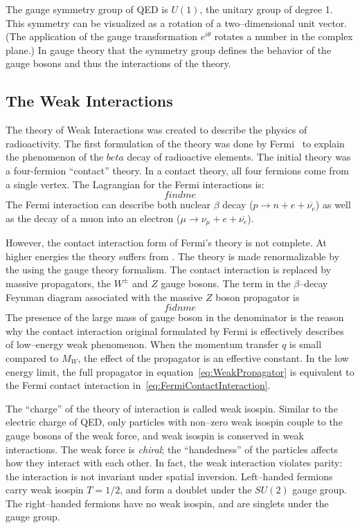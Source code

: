 The gauge symmetry group of QED is $U(1)$, the unitary group of degree 1.  This
symmetry can be visualized as a rotation of a two--dimensional unit vector. (The
application of the gauge transformation $e^{i\theta}$ rotates a number in the
complex plane.)  In gauge theory that the symmetry group
defines the behavior of the gauge bosons and thus the interactions of the
theory.  

\subsection{The Weak Interactions}

The theory of Weak Interactions was created to describe the physics of
radioactivity.  The first formulation of the theory was done by
Fermi~\cite{ref:FermiWeakInteration} to explain the phenomenon of the $beta$
decay of radioactive elements.  The initial theory was a four-fermion
``contact'' theory.  In a contact theory, all four fermions come from a single
vertex.  The Lagrangian for the Fermi interactions is:
\begin{equation}
 find me 
 \label{eq:FermiContactInteraction}
\end{equation}
The Fermi interaction can describe both nuclear $\beta$ decay ($p \to n + e +
\overline{\nu_e}$) as well as the decay of a muon into an electron ($\mu \to \nu_\mu
+ e + \overline{\nu_e}$).

However, the contact interaction form of Fermi's theory is not complete.  At
higher energies the theory suffers from .  The theory is made
renormalizable by the using the gauge theory formalism.  The contact interaction
is replaced by massive propagators, the $W^\pm$ and $Z$ gauge bosons.  The term
in the $\beta$--decay Feynman diagram associated with the massive $Z$ boson
propagator is
\begin{equation}
  fidn me
  \label{eq:WeakPropagator}
\end{equation}
The presence of the large mass of gauge boson in the denominator is the reason
why the contact interaction original formulated by Fermi is effectively
describes of low--energy weak phenomenon.  When the momentum transfer $q$ is
small compared to $M_W$, the effect of the propagator is an effective constant.
In the low energy limit, the full propagator in equation~\ref{eq:WeakPropagator}
is equivalent to the Fermi contact interaction
in~\ref{eq:FermiContactInteraction}.

The ``charge'' of the theory of interaction is called weak isospin.  Similar to
the electric charge of QED, only particles with non--zero weak isospin couple to
the gauge bosons of the weak force, and weak isospin is conserved in weak
interactions.   The weak force is \emph{chiral}; the ``handedness'' of the
particles affects how they interact with each other.  In fact, the weak
interaction violates parity: the interaction is not invariant under spatial
inversion.  Left--handed fermions carry weak isospin $T = 1/2$, and form a
doublet under the $SU(2)$ gauge group.  The right--handed fermions have no weak
isospin, and are singlets under the gauge group.  

